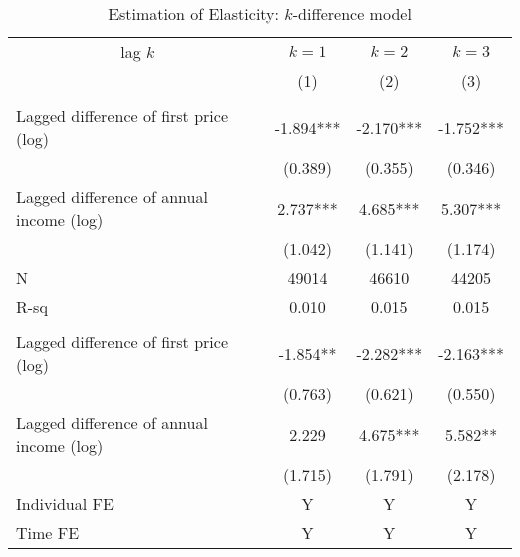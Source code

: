 \documentclass[ review  , 3p ]{elsarticle}
\begin{document}
  \begin{table}

  \caption{\label{tab:kablekDiffElasticity}Estimation of Elasticity: $k$-difference model}
  \centering
  \fontsize{7}{9}\selectfont
  \begin{threeparttable}
  \begin{tabular}[t]{lccc}
  \toprule
  \multicolumn{1}{c}{lag $k$} & \multicolumn{1}{c}{$k = 1$} & \multicolumn{1}{c}{$k = 2$} & \multicolumn{1}{c}{$k = 3$} \\
  \cmidrule(l{3pt}r{3pt}){1-1} \cmidrule(l{3pt}r{3pt}){2-2} \cmidrule(l{3pt}r{3pt}){3-3} \cmidrule(l{3pt}r{3pt}){4-4}
   & (1) & (2) & (3)\\
  \midrule
  \addlinespace[0.3em]
  \multicolumn{4}{l}{\textbf{Overall Elasticity}}\\
  \hspace{1em}Lagged difference of first price (log) & -1.894*** & -2.170*** & -1.752***\\
  \hspace{1em} & (0.389) & (0.355) & (0.346)\\
  \hspace{1em}Lagged difference of annual income (log) & 2.737*** & 4.685*** & 5.307***\\
  \hspace{1em} & (1.042) & (1.141) & (1.174)\\
  \hspace{1em}N & 49014 & 46610 & 44205\\
  \hspace{1em}R-sq & 0.010 & 0.015 & 0.015\\
  \addlinespace[0.3em]
  \multicolumn{4}{l}{\textbf{Intensive-Margin Elasticity}}\\
  \hspace{1em}Lagged difference of first price (log) & -1.854** & -2.282*** & -2.163***\\
  \hspace{1em} & (0.763) & (0.621) & (0.550)\\
  \hspace{1em}Lagged difference of annual income (log) & 2.229 & 4.675*** & 5.582**\\
  \hspace{1em} & (1.715) & (1.791) & (2.178)\\
  \hspace{1em}Individual FE & Y & Y & Y\\
  \hspace{1em}Time FE & Y & Y & Y\\

\end{tabular}
\end{threeparttable}
\end{table}
\end{document}

